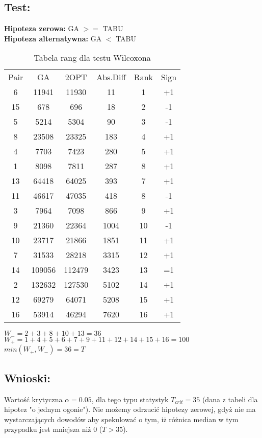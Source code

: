     \subsection{Test: }
    \textbf{Hipoteza zerowa: } GA $>=$ TABU \\
    \textbf{Hipoteza alternatywna: } GA $<$ TABU \\
    \begin{table}[!ht]
      \centering
      \begin{tabular}{| c | c | c | c | c | c |}
        \hline
        Pair & GA & 2OPT & Abs.Diff & Rank & Sign \\
        6 & 11941 & 11930 & 11 & 1 & +1 \\
        15 & 678 & 696 & 18 & 2 & -1 \\
        5 & 5214 & 5304 & 90 & 3 & -1 \\
        8 & 23508 & 23325 & 183 & 4 & +1 \\
        4 & 7703 & 7423 & 280 & 5 & +1 \\
        1 & 8098 & 7811 & 287 & 8 & +1 \\
        13 & 64418 & 64025 & 393 & 7 & +1 \\
        11 & 46617 & 47035 & 418 & 8 & -1 \\
        3 & 7964 & 7098 & 866 & 9 & +1 \\
        9 & 21360 & 22364 & 1004 & 10 & -1 \\
        10 & 23717 & 21866 & 1851 & 11 & +1 \\
        7 & 31533 & 28218 & 3315 & 12 & +1 \\
        14 & 109056 & 112479 & 3423 & 13 & =1 \\
        2 & 132632 & 127530 & 5102 & 14 & +1 \\
        12 & 69279 & 64071 & 5208 & 15 & +1 \\
        16 & 53914 & 46294 & 7620 & 16 & +1 \\

        \hline
          
      \end{tabular}
      \caption{Tabela rang dla testu Wilcoxona}
      $W_{-} = 2+3+8+10+13=36 $
      $W_{+} = 1+4+5+6+7+9+11+12+14+15+16 = 100 $
      $min(W_{+},W_{-}) = 36 = T$
  
    \end{table}
  \subsection{Wnioski: }
  Wartość krytyczna $\alpha = 0.05$, dla tego typu statystyk $T_{crit} = 35$ (dana z tabeli dla hipotez "o jednym ogonie").
  Nie możemy odrzucić hipotezy zerowej, gdyż nie ma wystarczających dowodów aby spekulować o tym, iż różnica median w tym przypadku jest mniejsza niż 0 ($ T > 35$).
    